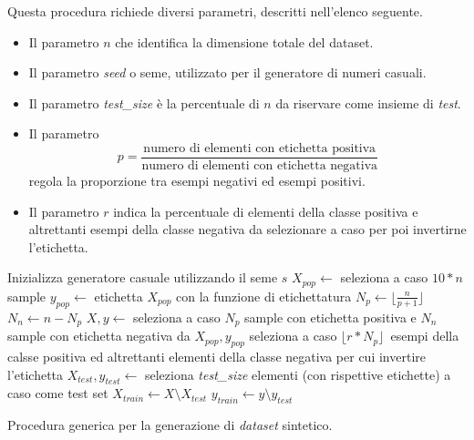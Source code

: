 Questa procedura richiede diversi parametri, descritti nell'elenco seguente.
\begin{itemize}
    \item Il parametro $n$ che identifica la dimensione totale del dataset.
    \item Il parametro \emph{seed} o seme, utilizzato per il generatore di numeri casuali.
    \item Il parametro \emph{test\_size} è la percentuale di $n$ da riservare come insieme di \emph{test}.
    \item Il parametro 
    \begin{equation*}
        p = \frac{\text{numero di elementi con etichetta positiva}}{\text{numero di elementi con etichetta negativa}}
    \end{equation*} 
    regola la proporzione tra esempi negativi ed esempi positivi.
    \item Il parametro $r$ indica la percentuale di elementi della classe positiva e altrettanti esempi della classe negativa da selezionare a caso per poi invertirne l'etichetta.
\end{itemize}
\begin{algorithm}
    \SetAlgoLined
    Inizializza generatore casuale utilizzando il seme $s$\;
    $X_{pop} \gets$ seleziona a caso $10*n$ sample\;
    $y_{pop} \gets$ etichetta $X_{pop}$ con la funzione di etichettatura\;
    $N_p \gets \lfloor\frac{n}{p + 1}\rfloor$\;
    $N_n \gets n - N_p$\;
    $X, y \gets$ seleziona a caso $N_p$ sample con etichetta positiva e $N_n$ sample con etichetta negativa da $X_{pop},y_{pop}$\;
    seleziona a caso $\lfloor r * N_p \rfloor$\ esempi della calsse positiva ed altrettanti elementi della classe negativa per cui invertire l'etichetta\;
    $X_{test}, y_{test} \gets$ seleziona \textit{test\_size} elementi (con rispettive etichette) a caso come test set\;
    $X_{train} \gets X \setminus X_{test}$\;
    $y_{train} \gets y \setminus y_{test}$\;
\caption{Procedura generica per la generazione di \emph{dataset} sintetico.}
\label{alg:generazione_dataset_sintetici}
\end{algorithm}

